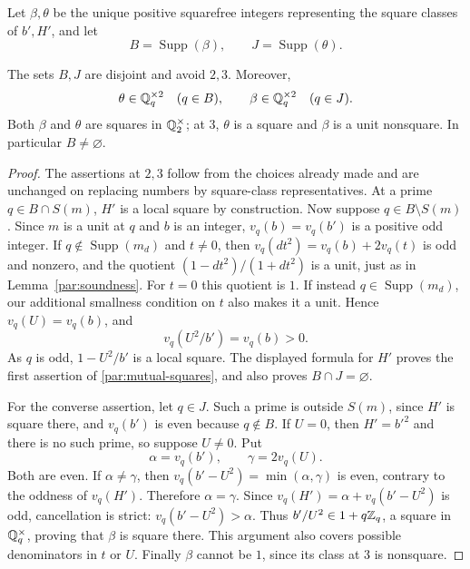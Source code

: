 Let $\beta,\theta$ be the unique positive squarefree integers
representing the square classes of $b',H'$, and let
\[
 B=\operatorname{Supp}(\beta),\qquad
 J=\operatorname{Supp}(\theta).
\]

\begin{lemma}\label{par:cross-squares}
The sets $B,J$ are disjoint and avoid $2,3$. Moreover,
\begin{equation}\label{par:mutual-squares}
 \theta\in\mathbb Q_q^{\times2}\quad(q\in B),\qquad
 \beta\in\mathbb Q_q^{\times2}\quad(q\in J).
\end{equation}
Both $\beta$ and $\theta$ are squares in $\mathbb Q_2^\times$; at $3$,
$\theta$ is a square and $\beta$ is a unit nonsquare. In particular
$B\ne\varnothing$.
\end{lemma}

\begin{proof}
The assertions at $2,3$ follow from the choices already made and
are unchanged on replacing numbers by square-class representatives.
At a prime $q\in B\cap S(m)$, $H'$ is a local square by construction.
Now suppose $q\in B\setminus S(m)$. Since $m$ is a unit at $q$ and
$b$ is an integer, $v_q(b)=v_q(b')$ is a positive odd integer.
If $q\notin\operatorname{Supp}(m_d)$ and $t\ne0$, then
$v_q(dt^2)=v_q(b)+2v_q(t)$ is odd and nonzero, and the quotient
$(1-dt^2)/(1+dt^2)$ is a unit, just as in
Lemma~\ref{par:soundness}. For $t=0$ this quotient is $1$.
If instead $q\in\operatorname{Supp}(m_d)$, our additional smallness
condition on $t$ also makes it a unit. Hence $v_q(U)=v_q(b)$, and
\[
 v_q(U^2/b')=v_q(b)>0.
\]
As $q$ is odd, $1-U^2/b'$ is a local square. The displayed formula
for $H'$ proves the first assertion of \eqref{par:mutual-squares},
and also proves $B\cap J=\varnothing$.

For the converse assertion, let $q\in J$. Such a prime is outside
$S(m)$, since $H'$ is square there, and $v_q(b')$ is even because
$q\notin B$. If $U=0$, then $H'=b'^2$ and there is no such prime,
so suppose $U\ne0$. Put
\[
 \alpha=v_q(b'),\qquad \gamma=2v_q(U).
\]
Both are even. If $\alpha\ne\gamma$, then
$v_q(b'-U^2)=\min(\alpha,\gamma)$ is even, contrary to
the oddness of $v_q(H')$. Therefore $\alpha=\gamma$.
Since $v_q(H')=\alpha+v_q(b'-U^2)$ is odd, cancellation is
strict: $v_q(b'-U^2)>\alpha$. Thus
$b'/U^2\in1+q\mathbb Z_q$, a square in $\mathbb Q_q^\times$, proving that
$\beta$ is square there. This argument also covers possible
denominators in $t$ or $U$. Finally $\beta$ cannot be $1$, since
its class at $3$ is nonsquare.
\end{proof}



